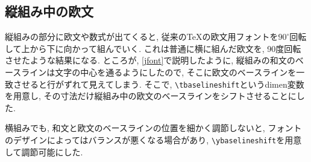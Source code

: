 \subsection{縦組み中の欧文}

縦組みの部分に欧文や数式が出てくると,
従来の\TeX の欧文用フォントを$90^\circ$回転して上から下に向かって組んでいく.
これは普通に横に組んだ欧文を, 90度回転させたような結果になる.
ところが, \ref{jfont}で説明したように,
縦組みの和文のベースラインは文字の中心を通るようにしたので,
そこに欧文のベースラインを一致させると行がずれて見えてしまう.
そこで, \verb|\tbaselineshift|というdimen変数を用意し,
その寸法だけ縦組み中の欧文のベースラインをシフトさせることにした.

横組みでも, 和文と欧文のベースラインの位置を細かく調節しないと,
フォントのデザインによってはバランスが悪くなる場合があり,
\verb|\ybaselineshift|を用意して調節可能にした.

